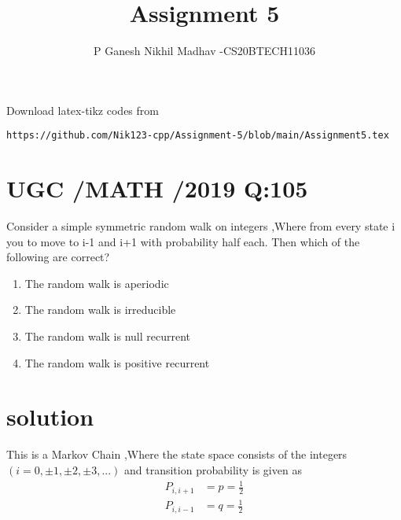 \documentclass[journal,12pt,twocolumn]{IEEEtran}
\begin{document}
     \def\rightbox#1{\makebox[0in][r]{#1}}
     \def\centbox#1{\makebox[0in]{#1}}
     \def\topbox#1{\raisebox{-\baselineskip}[0in][0in]{#1}}
     \def\midbox#1{\raisebox{-0.5\baselineskip}[0in][0in]{#1}}
\vspace{3cm}
\title{Assignment 5}
\author{P Ganesh Nikhil Madhav -CS20BTECH11036}
\maketitle
\newpage
\bigskip
\renewcommand{\thefigure}{\theenumi}
\renewcommand{\thetable}{\theenumi}
Download latex-tikz codes from 
\begin{lstlisting}
https://github.com/Nik123-cpp/Assignment-5/blob/main/Assignment5.tex
\end{lstlisting}
\section{ UGC /MATH /2019 Q:105 }
Consider a simple symmetric random walk on integers ,Where from every state i you to move to i-1 and i+1 with  probability half each. Then which of the following are correct?
\begin{enumerate}
    \item The random walk is aperiodic
    \item The random walk is irreducible
    \item The random walk is null recurrent 
    \item The random walk is positive recurrent 
\end{enumerate}

\section{solution }
This is a Markov Chain ,Where the state space consists of the integers $(i=0,\pm1,\pm2,\pm3,...)$ and transition  probability is given as
\begin{align}
   P_{i,i+1} &= p =\frac{1}{2}
   \\
   P_{i,i-1} & =q =\frac{1}{2}
\end{align}
\end{document}
